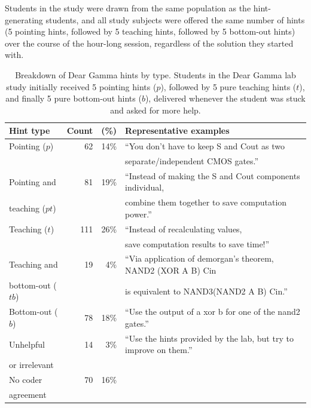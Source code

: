 Students in the study were drawn from the same population as the hint-generating students, and all study subjects were offered the same number of hints (5 pointing hints, followed by 5 teaching hints, followed by 5 bottom-out hints) over the course of the hour-long session, regardless of the solution they started with. 

\begin{table}[t]
\footnotesize
  \begin{center}
    \begin{tabular}{|l|r|r|l|}
\hline
      {\bf Hint type} & {\bf Count} & {\bf (\%)} & {\bf Representative examples} \\
\hline
      Pointing ($p$) & 62 & 14\% & ``You don't have to keep S and Cout as two  \\
       & & & separate/independent CMOS gates.'' \\
      \hline
      Pointing and  & 81 & 19\% & ``Instead of making the S and Cout components individual, \\
teaching ($pt$) & & & combine them together to save computation power.'' \\

\hline
      Teaching ($t$) & 111 & 26\% & ``Instead of recalculating values,  \\
      & & & save computation results to save time!'' \\
\hline
      Teaching and & 19 & 4\% & ``Via application of demorgan's theorem, NAND2 (XOR A B) Cin \\
bottom-out ($tb$) & & & is equivalent to NAND3(NAND2 A B) Cin.''\\
\hline
      Bottom-out ($b$) & 78 & 18\% & ``Use the output of a xor b for one of the nand2 gates.'' \\
\hline
      Unhelpful & 14 & 3\% & ``Use the hints provided by the lab, but try to improve on them.'' \\
      or irrelevant & & & \\
\hline
No coder & 70 & 16\% & \\
agreement & & & \\
\hline
    \end{tabular}
 \caption{Breakdown of Dear Gamma hints by type. Students in the Dear Gamma lab study initially received 5 pointing hints ($p$), followed by 5 pure teaching hints ($t$), and finally 5 pure bottom-out hints ($b$), delivered whenever the student was stuck and asked for more help. }
 \label{tab:hintTypes}
  \end{center}
   
\end{table}


